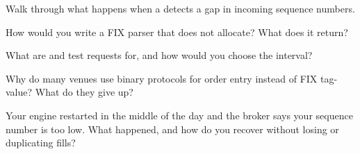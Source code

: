 \begin{interviewq}\label{iq:ll:protocols-i-fix:2}
Walk through what happens when a  detects a gap in incoming sequence numbers.
\end{interviewq}

\begin{interviewq}\label{iq:ll:protocols-i-fix:3}
How would you write a FIX parser that does not allocate? What does it return?
\end{interviewq}

\begin{interviewq}\label{iq:ll:protocols-i-fix:4}
What are  and test requests for, and how would you choose the  interval?
\end{interviewq}

\begin{interviewq}\label{iq:ll:protocols-i-fix:5}
Why do many venues use binary protocols for order entry instead of FIX tag-value? What do they give up?
\end{interviewq}

\begin{interviewq}\label{iq:ll:protocols-i-fix:6}
Your engine restarted in the middle of the day and the broker says your sequence number is too low. What happened, and how do
you recover without losing or duplicating fills?
\end{interviewq}
